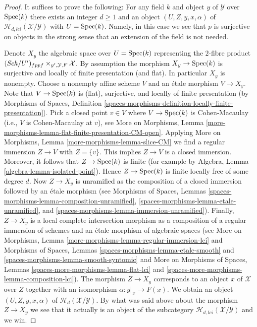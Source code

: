 \begin{proof}
It suffices to prove the following: For any field $k$
and object $y$ of $\mathcal{Y}$ over $\mathop{\mathrm{Spec}}(k)$ there exists
an integer $d \geq 1$ and an object $(U, Z, y, x, \alpha)$ of
$\mathcal{H}_{d, lci}(\mathcal{X}/\mathcal{Y})$ with $U = \mathop{\mathrm{Spec}}(k)$.
Namely, in this case we see that $p$ is surjective on objects in the
strong sense that an extension of the field is not needed.

\medskip\noindent
Denote $X_y$ the algebraic space over $U = \mathop{\mathrm{Spec}}(k)$
representing the $2$-fibre product
$(\mathit{Sch}/U')_{fppf} \times_{y', \mathcal{Y}, F} \mathcal{X}$.
By assumption the morphism $X_y \to \mathop{\mathrm{Spec}}(k)$ is surjective and
locally of finite presentation (and flat). In particular $X_y$ is
nonempty. Choose a nonempty affine scheme $V$ and an \'etale morphism
$V \to X_y$. Note that $V \to \mathop{\mathrm{Spec}}(k)$ is (flat), surjective,
and locally of finite presentation (by
Morphisms of Spaces,
Definition \ref{spaces-morphisms-definition-locally-finite-presentation}).
Pick a closed point $v \in V$ where $V \to \mathop{\mathrm{Spec}}(k)$ is Cohen-Macaulay
(i.e., $V$ is Cohen-Macaulay at $v$), see
More on Morphisms,
Lemma \ref{more-morphisms-lemma-flat-finite-presentation-CM-open}.
Applying
More on Morphisms,
Lemma \ref{more-morphisms-lemma-slice-CM}
we find a regular immersion $Z \to V$ with $Z = \{v\}$.
This implies $Z \to V$ is a closed immersion. Moreover, it follows that
$Z \to \mathop{\mathrm{Spec}}(k)$ is finite (for example by
Algebra, Lemma \ref{algebra-lemma-isolated-point}).
Hence $Z \to \mathop{\mathrm{Spec}}(k)$ is finite locally free of some degree $d$.
Now $Z \to X_y$ is unramified as the composition
of a closed immersion followed by an \'etale morphism
(see
Morphisms of Spaces, Lemmas \ref{spaces-morphisms-lemma-composition-unramified},
\ref{spaces-morphisms-lemma-etale-unramified}, and
\ref{spaces-morphisms-lemma-immersion-unramified}).
Finally, $Z \to X_y$ is a local complete intersection morphism
as a composition of a regular immersion of schemes and an \'etale
morphism of algebraic spaces (see
More on Morphisms, Lemma \ref{more-morphisms-lemma-regular-immersion-lci}
and
Morphisms of Spaces, Lemmas \ref{spaces-morphisms-lemma-etale-smooth} and
\ref{spaces-morphisms-lemma-smooth-syntomic} and
More on Morphisms of Spaces,
Lemmas \ref{spaces-more-morphisms-lemma-flat-lci} and
\ref{spaces-more-morphisms-lemma-composition-lci}).
The morphism $Z \to X_y$ corresponds to an object $x$ of $\mathcal{X}$
over $Z$ together with an isomorphism $\alpha : y|_Z \to F(x)$.
We obtain an object $(U, Z, y, x, \alpha)$ of
$\mathcal{H}_d(\mathcal{X}/\mathcal{Y})$. By what was said above about
the morphism $Z \to X_y$ we see that it actually is an object of the
subcategory $\mathcal{H}_{d, lci}(\mathcal{X}/\mathcal{Y})$ and we win.
\end{proof}




















